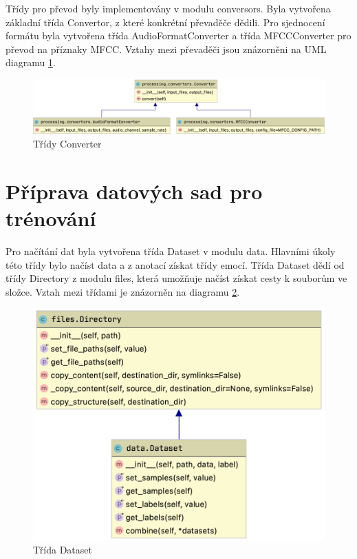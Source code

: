 \documentclass[FM,BP]{tulthesis}
\begin{document}
Třídy pro převod byly implementovány v modulu conversors. Byla vytvořena základní třída Convertor, z které konkrétní převaděče dědili. Pro sjednocení formátu byla vytvořena třída AudioFormatConverter a třída MFCCConverter pro převod na příznaky MFCC. Vztahy mezi převaděči jsou znázorněni na UML diagramu \ref{fig:convertor}.

\begin{figure}[ht]
\centerline{\includegraphics[width=\textwidth,height=\textheight,keepaspectratio]{convertors.png}}
\caption{Třídy Converter}
\label{fig:convertor}
\end{figure}
\FloatBarrier

\section{Příprava datových sad pro trénování}
Pro načítání dat byla vytvořena třída Dataset v modulu data. Hlavními úkoly této třídy bylo načíst data a z anotací získat třídy emocí. Třída Dataset dědí od třídy Directory z modulu files, která umožňuje načíst získat cesty k souborům ve složce. Vztah mezi třídami je znázorněn na diagramu \ref{fig:datasets}.

\begin{figure}[h!]
\centerline{\includegraphics[scale=.25,keepaspectratio]{data-dataset.png}}
\caption{Třída Dataset}
\label{fig:datasets}
\end{figure}
\FloatBarrier
\end{document}

